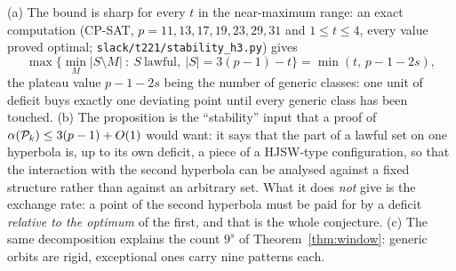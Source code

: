 \begin{remark}
(a) The bound is sharp for every $t$ in the near-maximum range: an exact computation (CP-SAT,
$p=11,13,17,19,23,29,31$ and $1\le t\le4$, every value proved optimal; \texttt{slack/t221/stability\_h3.py}) gives
\[
 \max\{\min_M|S\setminus M|\ :\ S\ \text{lawful},\ |S|=3(p-1)-t\}=\min(t,\,p-1-2s),
\]
the plateau value $p-1-2s$ being the number of generic classes: one unit of deficit buys exactly one deviating point until every
generic class has been touched.
(b) The proposition is the ``stability'' input that a proof of $\alpha(\mathcal{P}_k)\le3(p-1)+O(1)$ would want: it says that the part of a
lawful set on one hyperbola is, up to its own deficit, a piece of a HJSW-type configuration, so that the interaction with the second
hyperbola can be analysed against a fixed structure rather than against an arbitrary set.  What it does \emph{not} give is the exchange
rate: a point of the second hyperbola must be paid for by a deficit \emph{relative to the optimum} of the first, and that is the whole
conjecture.
(c) The same decomposition explains the count $9^s$ of Theorem~\ref{thm:window}: generic orbits are rigid, exceptional ones carry nine
patterns each.
\end{remark}
